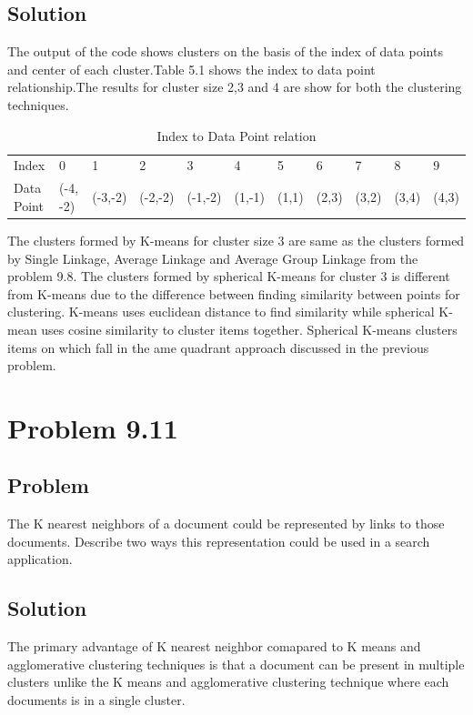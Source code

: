 \documentclass[12pt]{report}
\begin{document}
\section{Solution}


The output of the code shows clusters on the basis of the index of data points and center of each cluster.Table 5.1 shows the index to data point relationship.The results for cluster size 2,3 and 4 are show for both the clustering techniques.\\
\begin{table}[]
\centering
\caption{Index  to Data Point relation}
\label{my-label}
\begin{tabular}{lllllllllll}
Index      & 0        & 1       & 2       & 3       & 4      & 5     & 6     & 7     & 8     & 9     \\
Data Point & (-4, -2) & (-3,-2) & (-2,-2) & (-1,-2) & (1,-1) & (1,1) & (2,3) & (3,2) & (3,4) & (4,3)
\end{tabular}
\end{table}
The clusters formed by K-means for cluster size 3 are same as the clusters formed by Single Linkage, Average Linkage and Average Group Linkage from the problem 9.8. The clusters formed by spherical K-means for cluster 3 is different from K-means due to the difference between finding similarity between points for clustering. K-means uses euclidean distance to find similarity while spherical K-mean uses cosine similarity to cluster items together. Spherical K-means clusters items on which fall in the ame quadrant approach discussed in the previous problem.\\
\chapter{Problem 9.11}
\section{Problem}
The K nearest neighbors of a document could be represented by links to those documents. Describe two ways this representation could be used in a search application.
\section{Solution}
The primary advantage of K nearest neighbor comapared to K means and agglomerative clustering techniques is that a document can be present in multiple clusters unlike the K means and agglomerative clustering technique where each documents is in a single cluster.\\
\end{document}
